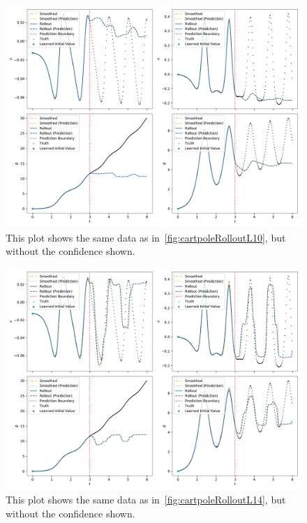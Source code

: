 	\begin{figure}
		\centering
		\includegraphics[width=\linewidth]{figures/results/cartpole-gym/run-latent-dim-10/without-confidence/rollout-observations-N0.pdf}
		\caption{This plot shows the same data as in~\autoref{fig:cartpoleRolloutL10}, but without the confidence shown.}
		\label{fig:cartpoleRolloutL10Appendix}
	\end{figure}

	\begin{figure}
		\centering
		\includegraphics[width=\linewidth]{figures/results/cartpole-gym/run-latent-dim-14/without-confidence/rollout-observations-N0.pdf}
		\caption{This plot shows the same data as in~\autoref{fig:cartpoleRolloutL14}, but without the confidence shown.}
		\label{fig:cartpoleRolloutL14Appendix}
	\end{figure}

